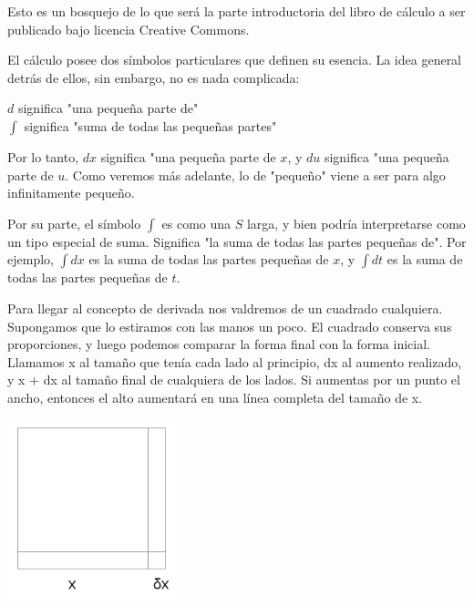 \documentclass{article}
\begin{document}

Esto es un bosquejo de lo que será la parte introductoria del libro de cálculo a ser publicado bajo licencia Creative Commons. 

El cálculo posee dos símbolos particulares que definen su esencia. La idea general detrás de ellos, sin embargo, no es nada complicada: \\
 
\begin{center}
$d$ significa "una pequeña parte de" \\
$\int$ significa "suma de todas las pequeñas partes" \\
\end{center}


Por lo tanto, $dx$ significa "una pequeña parte de $x$, y $du$ significa "una pequeña parte de $u$. Como veremos más adelante, lo de "pequeño" viene a ser para algo infinitamente pequeño.

Por su parte, el símbolo $\int$ es como una $S$ larga, y bien podría interpretarse como un tipo especial de suma. Significa "la suma de todas las partes pequeñas de". Por ejemplo, $\int dx$  es la suma de todas las partes pequeñas de $x$, y $\int dt$ es la suma de todas las partes pequeñas de $t$.

\newpage

Para llegar al concepto de derivada nos valdremos de un cuadrado cualquiera. Supongamos que lo estiramos con las manos un poco. El cuadrado conserva sus proporciones, y luego podemos comparar la forma final con la forma inicial. Llamamos x al tamaño que tenía cada lado al principio, dx al aumento realizado, y x + dx al tamaño final de cualquiera de los lados. Si aumentas por un punto el ancho, entonces el alto aumentará en una línea completa del tamaño de x. \\

	\begin{center}
	\includegraphics[width=5cm]{deriv_area_square}
	\end{center}
	
\end{document}
